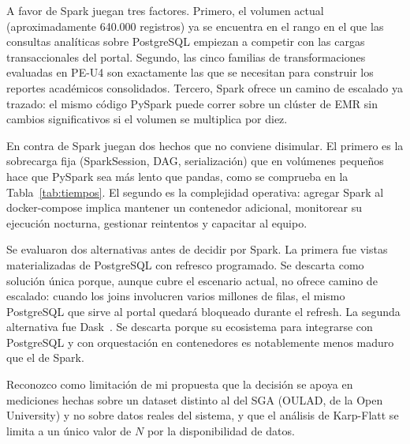\documentclass[11pt,a4paper]{article}
\begin{document}
A favor de Spark juegan tres factores. Primero, el volumen actual (aproximadamente 640.000 registros) ya se encuentra en el rango en el que las consultas analíticas sobre PostgreSQL empiezan a competir con las cargas transaccionales del portal. Segundo, las cinco familias de transformaciones evaluadas en PE-U4 son exactamente las que se necesitan para construir los reportes académicos consolidados. Tercero, Spark ofrece un camino de escalado ya trazado: el mismo código PySpark puede correr sobre un clúster de EMR sin cambios significativos si el volumen se multiplica por diez.

En contra de Spark juegan dos hechos que no conviene disimular. El primero es la sobrecarga fija (SparkSession, DAG, serialización) que en volúmenes pequeños hace que PySpark sea más lento que pandas, como se comprueba en la Tabla~\ref{tab:tiempos}. El segundo es la complejidad operativa: agregar Spark al docker-compose implica mantener un contenedor adicional, monitorear su ejecución nocturna, gestionar reintentos y capacitar al equipo.

Se evaluaron dos alternativas antes de decidir por Spark. La primera fue vistas materializadas de PostgreSQL con refresco programado. Se descarta como solución única porque, aunque cubre el escenario actual, no ofrece camino de escalado: cuando los joins involucren varios millones de filas, el mismo PostgreSQL que sirve al portal quedará bloqueado durante el refresh. La segunda alternativa fue Dask~\cite{jaime2021}. Se descarta porque su ecosistema para integrarse con PostgreSQL y con orquestación en contenedores es notablemente menos maduro que el de Spark.

Reconozco como limitación de mi propuesta que la decisión se apoya en mediciones hechas sobre un dataset distinto al del SGA (OULAD, de la Open University) y no sobre datos reales del sistema, y que el análisis de Karp-Flatt se limita a un único valor de $N$ por la disponibilidad de datos.
\end{document}
